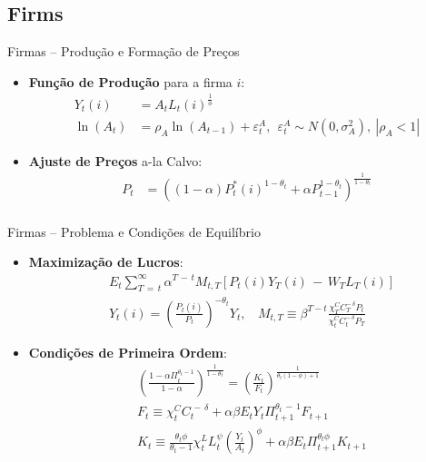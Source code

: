 \documentclass{beamer}
\begin{document}
\subsection{Firms}

\begin{frame}{Firmas -- Produção e Formação de Preços}
    \begin{itemize}
        \item \textbf{Função de Produção} para a firma \(i\):
        \begin{align*}
            Y_t(i) &= A_tL_t(i)^{\frac{1}{\phi}}\\
            \ln(A_t) &= \rho_A\ln(A_{t-1}) + \varepsilon_t^A, ~~ \varepsilon_t^A \sim N(0, \sigma^2_A),~ |\rho_A < 1| \tag{6}
        \end{align*}
        \item \textbf{Ajuste de Preços} a-la Calvo:
        \begin{align*}
            P_t &= \left((1-\alpha)P^*_t(i)^{1-\theta_t} + \alpha P_{t-1}^{1-\theta_t}\right)^\frac{1}{1-\theta_t}\\
        \end{align*}
    \end{itemize}
\end{frame}

\begin{frame}{Firmas -- Problema e Condições de Equilíbrio}
    \begin{itemize}
        \item \textbf{Maximização de Lucros}:
        \begin{align*}
            &E_{t}\sum_{T\,=\,t}^{\infty}\alpha^{T\,-\,t}M_{t,T}[P_{t}(i)Y_{T}(i)\,-\,W_{T}L_{T}(i)]\\
            &Y_{t}(i) = \left(\frac{P_{t}(i)}{P_{t}}\right)^{-\theta_{t}}Y_{t}, ~~~~ M_{t,T} \equiv \beta^{T-t}\frac{\chi_{T}^{C}C_{T}^{-\,\delta}P_{t}}{\chi_{t}^{C}C_{t}^{-\,\delta}P_{T}}
        \end{align*}
        \item \textbf{Condições de Primeira Ordem}:
        \begin{align*}
            &\left(\frac{1 - \alpha\Pi_t^{\theta_t-1}}{1-\alpha}\right)^{\frac{1}{1-\theta_t}} = \left(\frac{K_t}{F_t}\right)^\frac{1}{\theta_t(1-\phi)+1} \tag{7}\\
            &F_{t} \equiv \chi_{t}^{C}C_{t}^{\,-\,\delta} +  \alpha\beta E_{t}Y_{t}\Pi_{t+1}^{\theta_{t}\,-\,1}F_{t+1} \tag{8}\\
            &K_{t} \equiv \frac{\theta_{t}\phi}{\theta_{t}-1}\chi_{t}^{L}L_{t}^{\psi}\left(\frac{Y_{t}}{A_{t}}\right)^{\phi} + \alpha\beta E_t \Pi_{t+1}^{\theta_{t}\phi}K_{t+1} \tag{9}
        \end{align*}
    \end{itemize}
\end{frame}
\end{document}
